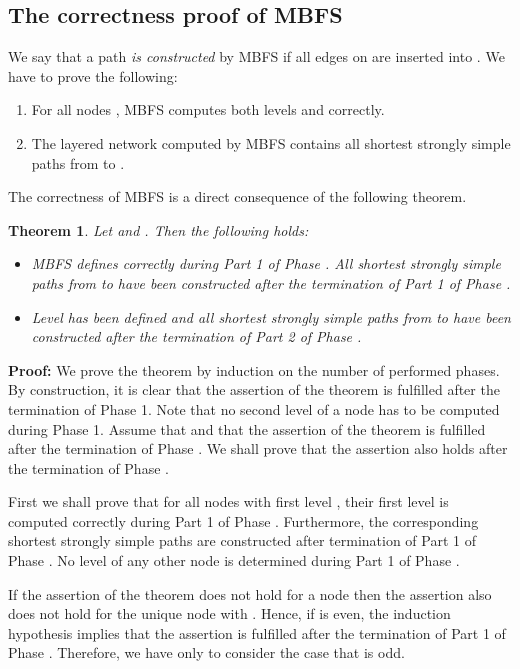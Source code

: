 \documentclass[12pt,twoside,a4paper]{article}
\newtheorem{theo}{Theorem}
\begin{document}
\subsection{The correctness proof of MBFS}

We say that a path  {\em is constructed} by MBFS if all edges on  are inserted into
. We have to prove the following: 
\begin{enumerate}
\item
For all nodes , MBFS computes both levels  and  correctly.
\item
The layered network  computed by MBFS contains all shortest
strongly simple paths from  to .
\end{enumerate}
The correctness of MBFS is a direct consequence of the following theorem.

\begin{theo} \label{hk4}
Let  and . Then the following holds:
\vspace{-0.2cm}
\begin{itemize}
\item[a)]
MBFS defines  correctly during Part 1 of Phase . All 
shortest strongly simple paths from  to  have been constructed after the 
termination of Part 1 of Phase . 
\vspace{-0.2cm}
\item[b)]
Level has been defined and all shortest strongly simple paths from  to 
 have been constructed after the termination of Part 2 of Phase 
.
\end{itemize}
\end{theo}

\noindent
{\bf Proof:} 
We prove the theorem by induction on the number of performed phases. 
By construction, it is clear that the assertion of the theorem is fulfilled after the 
termination of Phase 1. Note that no second level of a node has to be computed during
Phase 1. Assume that  and that the assertion of the theorem is fulfilled after
the termination of Phase . We shall prove that the assertion also holds
after the termination of Phase .

First we shall prove that for all nodes with first level , their first level is computed 
correctly during Part 1 of Phase . Furthermore, the corresponding shortest strongly simple 
paths are constructed after termination of Part 1 of Phase . No level of any other node
is determined during Part 1 of Phase .

If the assertion of the theorem does not hold for a node  then the assertion also
does not hold for the unique node  with . Hence, if  is
even, the induction hypothesis implies that the assertion is fulfilled after the termination
of Part 1 of Phase . Therefore, we have only to consider the case that  is odd.
\end{document}
